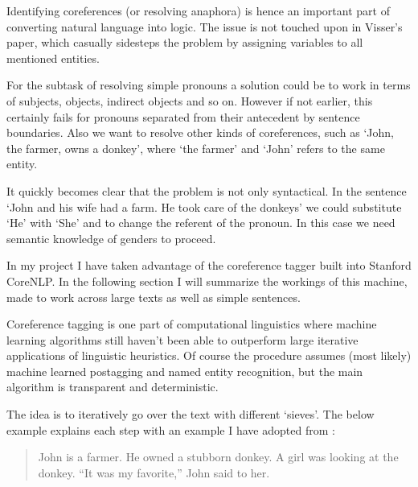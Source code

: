 \documentclass[12pt]{article}
\begin{document}
Identifying coreferences (or resolving anaphora) is hence an important part of converting natural language into logic. The issue is not touched upon in Visser's paper, which casually sidesteps the problem by assigning variables to all mentioned entities.

For the subtask of resolving simple pronouns a solution could be to work in terms of subjects, objects, indirect objects and so on. However if not earlier, this certainly fails for pronouns separated from their antecedent by sentence boundaries. Also we want to resolve other kinds of coreferences, such as `John, the farmer, owns a donkey', where `the farmer' and `John' refers to the same entity.

It quickly becomes clear that the problem is not only syntactical. In the sentence `John and his wife had a farm. He took care of the donkeys' we could substitute `He' with `She' and to change the referent of the pronoun. In this case we need semantic knowledge of genders to proceed.

In my project I have taken advantage of the coreference tagger built into Stanford CoreNLP\cite{lee2013deterministic}\cite{lee2011stanford}\cite{raghunathan2010multi}. In the following section I will summarize the workings of this machine, made to work across large texts as well as simple sentences.

Coreference tagging is one part of computational linguistics where machine learning algorithms still haven't been able to outperform large iterative applications of linguistic heuristics. Of course the procedure assumes (most likely) machine learned postagging and named entity recognition, but the main algorithm is transparent and deterministic.

The idea is to iteratively go over the text with different `sieves'. The below example explains each step with an example I have adopted from \cite{lee2013deterministic}:

\begin{quotation}
John is a farmer. He owned a stubborn donkey.
A girl was looking at the donkey.
``It was my favorite,'' John said to her.
\end{quotation}
\end{document}

